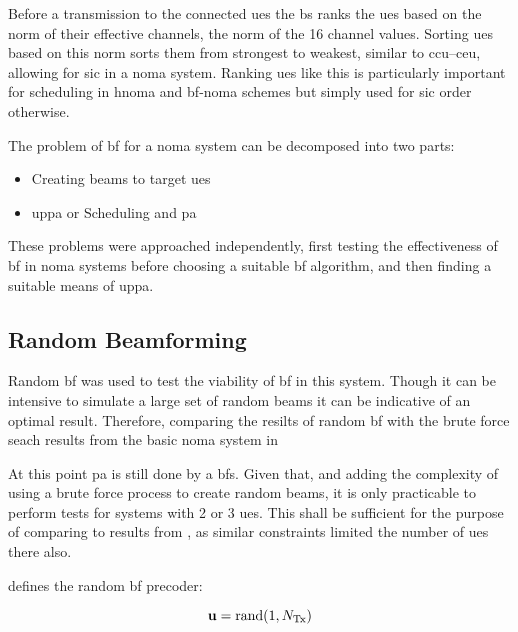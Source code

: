 \par
Before a transmission to the connected \acp{ue} the \ac{bs} ranks the \acp{ue} based on the norm of their effective channels, the norm of the 16 channel values.
Sorting \acp{ue} based on this norm sorts them from strongest to weakest, similar to \ac{ccu}--\ac{ceu}, allowing for \ac{sic} in a \ac{noma} system.
Ranking \acp{ue} like this is particularly important for scheduling in \ac{hnoma} and \ac{bf}-\ac{noma} schemes but simply used for \ac{sic} order otherwise.

\par
The problem of \ac{bf} for a \ac{noma} system can be decomposed into two parts:

\begin{itemize}
	\item Creating beams to target \acp{ue}
	\item \ac{uppa} or Scheduling and \ac{pa}
\end{itemize}

\par
These problems were approached independently, first testing the effectiveness of \ac{bf} in \ac{noma} systems before choosing a suitable \ac{bf} algorithm, and then finding a suitable means of \ac{uppa}.

\subsection{Random Beamforming}
\label{sec:rbf}
Random \ac{bf} was used to test the viability of \ac{bf} in this system.
Though it can be intensive to simulate a large set of random beams it can be indicative of an optimal result.
Therefore, comparing the resilts of random \ac{bf} with the brute force seach results from the basic \ac{noma} system in 

\par
At this point \ac{pa} is still done by a \ac{bfs}.
Given that, and adding the complexity of using a brute force process to create random beams, it is only practicable to perform tests for systems with 2 or 3 \acp{ue}.
This shall be sufficient for the purpose of comparing to results from , as similar constraints limited the number of \acp{ue} there also.

\par
{} defines the random \ac{bf} precoder:

\begin{equation}
	\mathbf{u} = \textrm{rand}(1, N_{\textrm{Tx}})
	\label{eq:rbf}
\end{equation}

